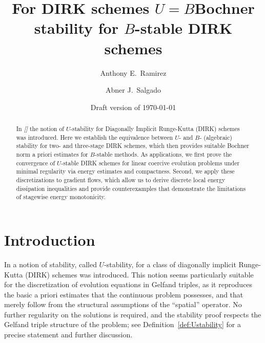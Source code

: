 \documentclass{amsart}
\theoremstyle{definition}
\newcommand{\AJS}[1]{#1}
\begin{document}
\title[DIRK schemes]{For DIRK schemes $U=B$}
\title[DIRK schemes]{\AJS{Bochner stability for $B$-stable DIRK schemes}}

\author[A.~Ramirez]{Anthony E.~Ramirez}
\author[A.J.~Salgado]{Abner J.~Salgado}

\address{Department of Mathematics, University of Tennessee, Knoxville TN 37996 USA.}



\date{Draft version of \today}





\begin{abstract}
    \AJS{In \emph{[]} the notion of $U$-stability for Diagonally Implicit Runge-Kutta (DIRK) schemes was introduced. Here we establish the equivalence between $U$- and $B$- (algebraic) stability for two- and three-stage DIRK schemes, which then} provides suitable Bochner norm a priori estimates for $B$-stable methods. \AJS{As applications}, we first prove the convergence of $U$-stable DIRK schemes for linear coercive evolution problems under minimal regularity via energy estimates and compactness. Second, we apply these discretizations to gradient flows, which allow us to derive discrete local energy dissipation inequalities and provide \AJS{counterexamples that} demonstrate the limitations of stagewise energy monotonicity.
\end{abstract}

\maketitle

\section{Introduction}

In \cite{MR4673496} a notion of stability, called $U$-stability, for a class of diagonally implicit Runge-Kutta (DIRK) schemes was introduced. This notion seems particularly suitable for the discretization of evolution equations in Gelfand triples, as it reproduces the basic a priori estimates that the continuous problem possesses, and that merely follow from the structural assumptions of the ``spatial'' operator. No further regularity on the solutions is required, and the stability proof respects the Gelfand triple structure of the problem; see Definition~\ref{def:Ustability} for a precise statement and further discussion.
\end{document}
